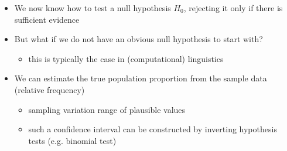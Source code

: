 \documentclass[a4paper,landscape,headrule,footrule,xetex]{foils}
\begin{document}
 \begin{itemize}
 \item We now know how to test a null hypothesis $H_0$,
   rejecting it only if there is sufficient evidence
 \item But what if we do not have an obvious
   null hypothesis to start with?
   \begin{itemize}
 \item this is typically the case in (computational) linguistics
 \end{itemize}
\item We can estimate the true population proportion
from the sample data (relative frequency)
\begin{itemize}
\item sampling variation \into range of plausible values
\item such a confidence interval can be constructed by
inverting hypothesis tests (e.g. binomial test)
\end{itemize}
\end{itemize}
\end{document}
